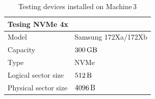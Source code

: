 \documentclass[
  color, %
  table, %
  lof,   %
  lot,   %
]{fithesis3}
\begin{document}
\begin{table}[!htb]
\centering
\begin{tabular}{|l|l|}

    \hline
    \multicolumn{2}{|l|}{Tesing NVMe 4x} \\ \hline %
     Model & Samsung 172Xa/172Xb \\
    \hline
     Capacity & $\SI{300}{\giga\byte}$  \\
    \hline
    Type & NVMe \\
    \hline    
    Logical sector size & $\SI{512}{\byte}$ \\    
    \hline    
     Physical sector size & $\SI{4096}{\byte}$ \\

    \hline
\end{tabular}
\caption{Testing devices installed on Machine\,3}
\end{table}
\addtolength{\textheight}{-1.75in}
\addtolength{\topmargin}{1in}

\clearpage


\end{document}
